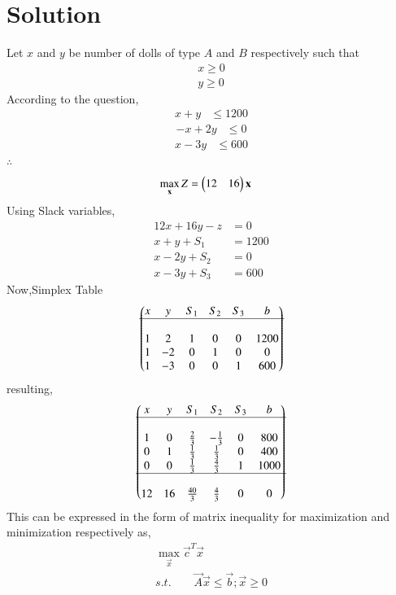 \documentclass[journal,12pt,twocolumn]{IEEEtran}
\begin{document}
\section{Solution}
Let $x$ and $y$ be number of dolls of type $A$ and $B$ respectively such that 
\begin{align}
    x \geq 0 \\
    y \geq 0 
\end{align}
According to the question,
\begin{align}
    x+y &\leq 1200 
\end{align}
\begin{align}
   -x+2y &\leq 0 
\end{align}
\begin{align}
   x-3y &\leq 600 
\end{align}
$\therefore$ 
\begin{align}
        \max_{\mathbf{x}} Z &= \begin{pmatrix}12 & 16\end{pmatrix}\mathbf{x}
\end{align}
Using Slack variables,
\begin{align}
    12x+16y-z &=0\\
    x+y+S_1 &=1200\\
    x-2y+S_2&=0\\
    x-3y+S_3&=600
\end{align}
Now,Simplex Table
\begin{align}
    \begin{pmatrix}x & y & S_1 & S_2 & S_3 & b \\\hline\\ 1 & 2 & 1 & 0 & 0 & 1200 \\ 1 & -2 & 0 & 1 & 0 & 0  \\ 1 & -3 & 0 & 0 & 1 & 600\end{pmatrix} 
\end{align}
resulting,
\begin{align}
 \begin{pmatrix}x & y & S_1 & S_2 & S_3 & b \\\hline\\ 1 & 0 & \frac{2}{3} & -\frac{1}{3} & 0 & 800 \\ 0 & 1 & \frac{1}{3} & \frac{1}{3} & 0 & 400  \\ 0 & 0 & \frac{1}{3} & \frac{4}{3} & 1 & 1000\\ \hline \\ 12 & 16 & \frac{40}{3} & \frac{4}{3} & 0 & 0\end{pmatrix} 
\end{align}
This can be expressed in the form of matrix inequality for maximization and minimization respectively as,
\begin{align}
        \max_{\vec{x}}\vec{c}^T \vec{x}\\
        s.t. \quad \quad 
        \vec{A}\vec{x}\leq\vec{b};\vec{x}\geq 0
\end{align}
\end{document}
